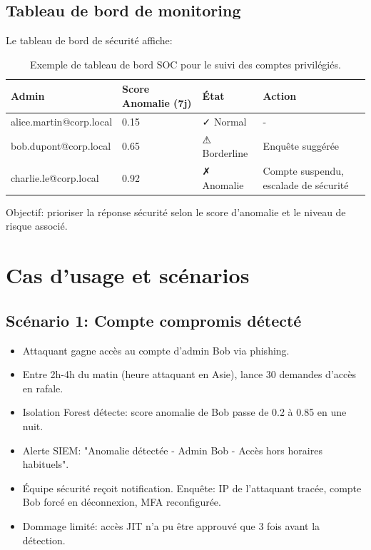 \subsection{Tableau de bord de monitoring}

Le tableau de bord de sécurité affiche:

\begin{table}[h]
\centering
\begin{tabularx}{\textwidth}{|l|p{3cm}|l|p{5cm}|}
\hline
\textbf{Admin} & \textbf{Score Anomalie (7j)} & \textbf{État} & \textbf{Action} \\
\hline
alice.martin@corp.local & 0.15 & ✓ Normal & - \\
\hline
bob.dupont@corp.local & 0.65 & ⚠ Borderline & Enquête suggérée \\
\hline
charlie.le@corp.local & 0.92 & ✗ Anomalie & Compte suspendu, escalade de sécurité \\
\hline
\end{tabularx}
\caption{Exemple de tableau de bord SOC pour le suivi des comptes privilégiés. }
\label{tab:dashboard_anomalies_admin}
\end{table}

Objectif: prioriser la réponse sécurité selon le score d'anomalie et le niveau de risque associé.

\section{Cas d'usage et scénarios}

\subsection{Scénario 1: Compte compromis détecté}

\begin{itemize}
	\item Attaquant gagne accès au compte d'admin Bob via phishing.
	\item Entre 2h-4h du matin (heure attaquant en Asie), lance 30 demandes d'accès en rafale.
	\item Isolation Forest détecte: score anomalie de Bob passe de 0.2 à 0.85 en une nuit.
	\item Alerte SIEM: "Anomalie détectée - Admin Bob - Accès hors horaires habituels".
	\item Équipe sécurité reçoit notification. Enquête: IP de l'attaquant tracée, compte Bob forcé en déconnexion, MFA reconfigurée.
	\item Dommage limité: accès JIT n'a pu être approuvé que 3 fois avant la détection.
\end{itemize}

